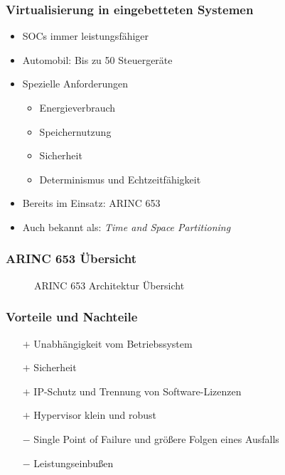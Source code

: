 \documentclass[]{beamer}
\newcommand{\inputImage}[1]{}
\begin{document}
\begin{frame}
\frametitle{Virtualisierung in eingebetteten Systemen}
    \begin{itemize}
        \item SOCs immer leistungsfähiger
        \item Automobil: Bis zu 50 Steuergeräte
        \item Spezielle Anforderungen
        \begin{itemize}
            \item Energieverbrauch
            \item Speichernutzung
            \item Sicherheit
            \item Determinismus und Echtzeitfähigkeit
        \end{itemize}
        \item Bereits im Einsatz: ARINC 653
        \item Auch bekannt als: \emph{Time and Space Partitioning}
    \end{itemize}
\end{frame}


\begin{frame}
\frametitle{ARINC 653 Übersicht}
    \begin{figure}[ht]
        \centering
        \resizebox{0.65\linewidth}{!}{\inputImage{arinc653.dia}}
        \caption{ARINC 653 Architektur Übersicht}
        \label{fig:arinc_653}
    \end{figure}
\end{frame}



\begin{frame}
\frametitle{Vorteile und Nachteile}
    \begin{itemize}
        \item[$ + $] Unabhängigkeit vom Betriebssystem
        \item[$ + $] Sicherheit
        \item[$ + $] IP-Schutz und Trennung von Software-Lizenzen
        \item[$ + $] Hypervisor klein und robust

        \item[$ - $] Single Point of Failure und größere Folgen eines Ausfalls
        \item[$ - $] Leistungseinbußen
    \end{itemize}
\end{frame}
\end{document}
